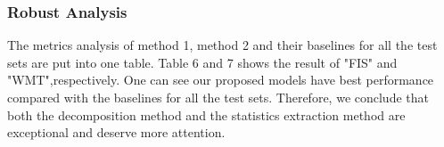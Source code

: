 





\subsubsection{Robust Analysis}
 The metrics analysis of method 1, method 2 and their baselines for all the test sets are put into one table. Table 6 and 7 shows the result of "FIS" and "WMT",respectively.  One can see our proposed models have best performance compared with the baselines for all the test sets. Therefore, we conclude that both the decomposition method and the statistics extraction method 
are exceptional and deserve more attention.

